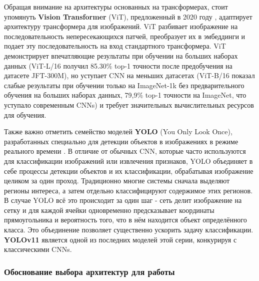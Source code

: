 \documentclass[14pt]{extarticle}
\begin{document}
Обращая внимание на архитектуры основанных на трансформерах, стоит упомянуть \textbf{Vision Transformer} (ViT), предложенный в 2020 году \cite{dosovitskiy2020image}, адаптирует архитектуру трансформера для изображений. ViT разбивает изображение на последовательность непересекающихся патчей, преобразует их в эмбеддинги и подает эту последовательность на вход стандартного трансформера. ViT демонстрирует впечатляющие результаты при обучении на больших наборах данных (ViT-L/16 получил 85.30\% top-1 точности после предобучения на датасете JFT-300M), но уступает CNN на меньших датасетах (ViT-B/16 показал слабые результаты при обучении только на ImageNet-1k без предварительного обучения на больших наборах данных, 79,9\% top-1 точности на ImageNet, что уступало современным CNNs) и требует значительных вычислительных ресурсов для обучения.

Также важно отметить семейство моделей \textbf{YOLO} (You Only Look Once), разработанных специально для детекции объектов в изображениях в режиме реального времени \cite{redmon2015you}. В отличие от обычных CNN, которые часто используются для классификации изображений или извлечения признаков, YOLO объединяет в себе процессы детекции объектов и их классификации, обрабатывая изображение целиком за один проход. Традиционно многие системы сначала выделяют регионы интереса, а затем отдельно классифицируют содержимое этих регионов. В случае YOLO всё это происходит за один шаг - сеть делит изображение на сетку и для каждой ячейки одновременно предсказывает координаты прямоугольника и вероятность того, что в нём находится объект определённого класса. Это объединение позволяет существенно ускорить задачу классификации. \textbf{YOLOv11} \cite{Khanam2024yolov11} является одной из последних моделей этой серии, конкурируя с классическими CNNs.
\vspace{-15pt}

\subsubsection{Обоснование выбора архитектур для работы}
\end{document}
